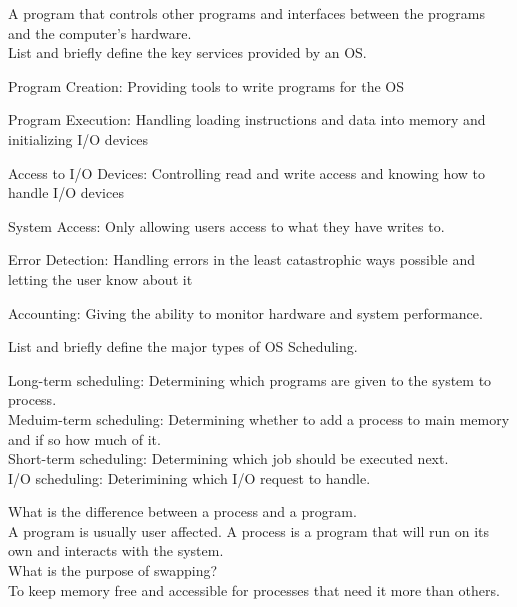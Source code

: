 \documentclass[12pt,largemargins]{homework}
\begin{document}
A program that controls other programs and interfaces between the programs and the computer's hardware.\\
List and briefly define the key services provided by an OS.\\
\begin{alphaparts}
	\item Program Creation: Providing tools to write programs for the OS\\
	\item Program Execution: Handling loading instructions and data into memory and initializing I/O devices\\
	\item Access to I/O Devices: Controlling read and write access and knowing how to handle I/O devices\\
	\item System Access: Only allowing users access to what they have writes to.\\
	\item Error Detection: Handling errors in the least catastrophic ways possible and letting the user know about it\\
	\item Accounting: Giving the ability to monitor hardware and system performance.\\
\end{alphaparts}
List and briefly define the major types of OS Scheduling.\\ 
\begin{alphaparts}
Long-term scheduling: Determining which programs are given to the system to process.\\
Meduim-term scheduling: Determining whether to add a process to main memory and if so how much of it.\\
Short-term scheduling: Determining which job should be executed next.\\
I/O scheduling: Deterimining which I/O request to handle.\\
\end{alphaparts}
What is the difference between a process and a program.\\
A program is usually user affected. A process is a program that will run on its own and interacts with the system.\\
What is the purpose of swapping?\\
To keep memory free and accessible for processes that need it more than others.\\
\end{document}
